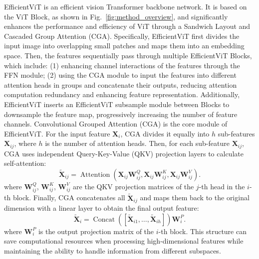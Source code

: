 \documentclass[a4paper,fleqn]{cas-sc}
\begin{document}
EfficientViT \citep{liu2023efficientvit} is an efficient vision Transformer \citep{dosovitskiy2020image} backbone network. It is based on the ViT Block, as shown in Fig.~\ref{fig:method_overview}, and significantly enhances the performance and efficiency of ViT through a Sandwich Layout and Cascaded Group Attention (CGA). Specifically, EfficientViT first divides the input image into overlapping small patches and maps them into an embedding space. Then, the features sequentially pass through multiple EfficientViT Blocks, which include: (1) enhancing channel interactions of the features through the FFN module; (2) using the CGA module to input the features into different attention heads in groups and concatenate their outputs, reducing attention computation redundancy and enhancing feature representation. Additionally, EfficientViT inserts an EfficientViT subsample module between Blocks to downsample the feature map, progressively increasing the number of feature channels. Convolutional Grouped Attention (CGA) is the core module of EfficientViT. For the input feature $\mathbf{X}_i$, CGA divides it equally into $h$ sub-features $\mathbf{X}_{ij}$, where $h$ is the number of attention heads. Then, for each sub-feature $\mathbf{X}_{ij}$, CGA uses independent Query-Key-Value (QKV) projection layers to calculate self-attention:
\begin{equation}
	\tilde{\mathbf{X}}_{ij} = \operatorname{Attention}(\mathbf{X}_{ij}\mathbf{W}^Q_{ij}, \mathbf{X}_{ij}\mathbf{W}^K_{ij}, \mathbf{X}_{ij}\mathbf{W}^V_{ij}).
\end{equation}
where $\mathbf{W}^Q_{ij}$, $\mathbf{W}^K_{ij}$, $\mathbf{W}^V_{ij}$ are the QKV projection matrices of the $j$-th head in the $i$-th block. Finally, CGA concatenates all $\tilde{\mathbf{X}}_{ij}$ and maps them back to the original dimension with a linear layer to obtain the final output feature:
\begin{equation}
	\tilde{\mathbf{X}}_i = \operatorname{Concat}([\tilde{\mathbf{X}}_{i1}, \ldots, \tilde{\mathbf{X}}_{ih}])\mathbf{W}^P_i.
\end{equation}
where $\mathbf{W}^P_i$ is the output projection matrix of the $i$-th block. This structure can save computational resources when processing high-dimensional features while maintaining the ability to handle information from different subspaces.
\end{document}
